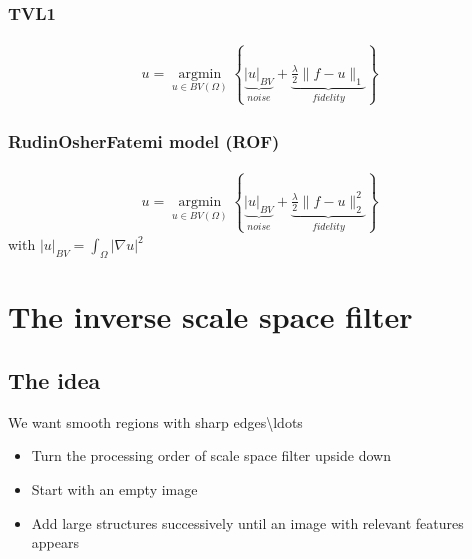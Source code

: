 \documentclass[letterpaper,10pt,english]{sphinxmanual}
\begin{document}
\subsubsection{TV\sphinxhyphen{}L1}
\label{\detokenize{02-ImageEnhancement:tv-l1}}\begin{equation*}
\begin{split}u=\underset{u\in BV(\Omega)}{\operatorname{argmin}}\left\{\underbrace{|u|_{BV}}_{noise}+ \underbrace{\mbox{$\frac{\lambda}{2}$}\|f-u\|_{1}}_{fidelity}\right\}\end{split}
\end{equation*}

\subsubsection{Rudin\sphinxhyphen{}Osher\sphinxhyphen{}Fatemi model (ROF)}
\label{\detokenize{02-ImageEnhancement:rudin-osher-fatemi-model-rof}}\begin{equation*}
\begin{split}u=\underset{u\in BV(\Omega)}{\operatorname{argmin}}
\left\{
\underbrace{|u|_{BV}}_{noise} 
+ \underbrace{\mbox{$\frac{\lambda}{2}$} \|f-u\|^2_{2}}_{fidelity}
\right\}\end{split}
\end{equation*}
\sphinxAtStartPar
with \(|u|_{BV}=\int_{\Omega}|\nabla u|^2\)


\section{The inverse scale space filter}
\label{\detokenize{02-ImageEnhancement:the-inverse-scale-space-filter}}

\subsection{The idea}
\label{\detokenize{02-ImageEnhancement:the-idea}}
\sphinxAtStartPar
We want smooth regions with sharp edges\textbackslash{}ldots
\begin{itemize}
\item {} 
\sphinxAtStartPar
Turn the processing order of scale space filter upside down

\item {} 
\sphinxAtStartPar
Start with an empty image

\item {} 
\sphinxAtStartPar
Add large structures successively until an image with relevant features appears

\end{itemize}
\end{document}
